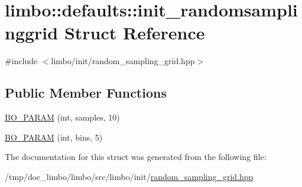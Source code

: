 \hypertarget{structlimbo_1_1defaults_1_1init__randomsamplinggrid}{}\section{limbo\+:\+:defaults\+:\+:init\+\_\+randomsamplinggrid Struct Reference}
\label{structlimbo_1_1defaults_1_1init__randomsamplinggrid}


{\ttfamily \#include $<$limbo/init/random\+\_\+sampling\+\_\+grid.\+hpp$>$}

\subsection*{Public Member Functions}
\begin{DoxyCompactItemize}
\item 
\hyperlink{group__init__defaults_ga5658d4c9a618c34b465ab42491d0062f}{B\+O\+\_\+\+P\+A\+R\+A\+M} (int, samples, 10)
\item 
\hyperlink{group__init__defaults_ga783c6c712518eb0a1e4abbfdffc0fa51}{B\+O\+\_\+\+P\+A\+R\+A\+M} (int, bins, 5)
\end{DoxyCompactItemize}


The documentation for this struct was generated from the following file\+:\begin{DoxyCompactItemize}
\item 
/tmp/doc\+\_\+limbo/limbo/src/limbo/init/\hyperlink{random__sampling__grid_8hpp}{random\+\_\+sampling\+\_\+grid.\+hpp}\end{DoxyCompactItemize}
